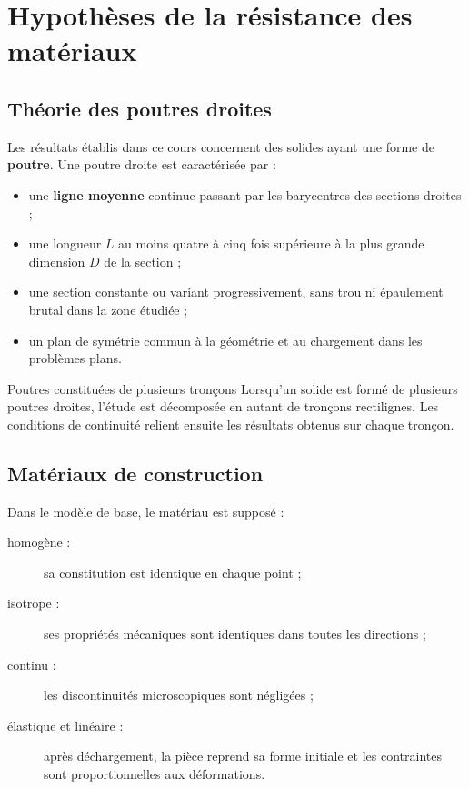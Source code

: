 \section{Hypothèses de la résistance des matériaux}
\label{sec:rdm-2}

\subsection{Théorie des poutres droites}

Les résultats établis dans ce cours concernent des solides ayant une forme de \textbf{poutre}. Une poutre droite est caractérisée par :
\begin{itemize}
  \item une \textbf{ligne moyenne} continue passant par les barycentres des sections droites ;
  \item une longueur $L$ au moins quatre à cinq fois supérieure à la plus grande dimension $D$ de la section ;
  \item une section constante ou variant progressivement, sans trou ni épaulement brutal dans la zone étudiée ;
  \item un plan de symétrie commun à la géométrie et au chargement dans les problèmes plans.
\end{itemize}

\TLPoutreReperee

\begin{TLWarning}{Poutres constituées de plusieurs tronçons}
Lorsqu'un solide est formé de plusieurs poutres droites, l'étude est décomposée en autant de tronçons rectilignes. Les conditions de continuité relient ensuite les résultats obtenus sur chaque tronçon.
\end{TLWarning}

\subsection{Matériaux de construction}

Dans le modèle de base, le matériau est supposé :
\begin{description}
  \item[homogène :] sa constitution est identique en chaque point ;
  \item[isotrope :] ses propriétés mécaniques sont identiques dans toutes les directions ;
  \item[continu :] les discontinuités microscopiques sont négligées ;
  \item[élastique et linéaire :] après déchargement, la pièce reprend sa forme initiale et les contraintes sont proportionnelles aux déformations.
\end{description}

